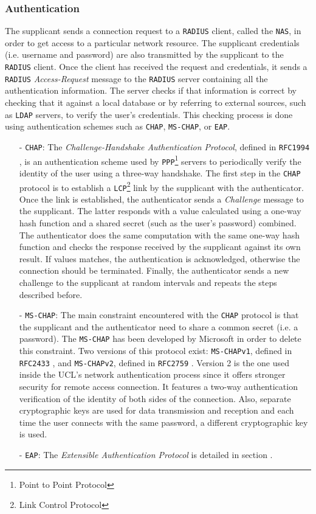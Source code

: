 \subsubsection{Authentication}
The supplicant sends a connection request to a \texttt{RADIUS} client, called the \texttt{NAS}, in order to get access to a particular network resource. The supplicant credentials (i.e. username and password) are also transmitted by the supplicant to the \texttt{RADIUS} client. Once the client has received the request and credentials, it sends a \texttt{RADIUS} \textit{Access-Request} message to the \texttt{RADIUS} server containing all the authentication information. The server checks if that information is correct by checking that it against a local database or by referring to external sources, such as \texttt{LDAP} servers, to verify the user's credentials. This checking process is done using authentication schemes such as \texttt{CHAP}, \texttt{MS-CHAP}, or \texttt{EAP}.
	\begin{itemize}
		\item [-] \texttt{CHAP}: The \textit{Challenge-Handshake Authentication Protocol}, defined in \texttt{RFC1994} \cite{rfc1994}, is an authentication scheme used by \texttt{PPP}\footnote{Point to Point Protocol} servers to periodically verify the identity of the user using a three-way handshake. The first step in the \texttt{CHAP} protocol is to establish a \texttt{LCP}\footnote{Link Control Protocol} link by the supplicant with the authenticator. Once the link is established, the authenticator sends a \textit{Challenge} message to the supplicant. The latter responds with a value calculated using a one-way hash function and a shared secret (such as the user's password) combined. The authenticator does the same computation with the same one-way hash function and checks the response received by the supplicant against its own result. If values matches, the authentication is acknowledged, otherwise the connection should be terminated. Finally, the authenticator sends a new challenge to the supplicant at random intervals and repeats the steps described before.

		\item [-] \texttt{MS-CHAP}: The main constraint encountered with the \texttt{CHAP} protocol is that the supplicant and the authenticator need to share a common secret (i.e. a password). The \texttt{MS-CHAP} has been developed by Microsoft in order to delete this constraint. Two versions of this protocol exist: \texttt{MS-CHAPv1}, defined in \texttt{RFC2433} \cite{rfc2433}, and \texttt{MS-CHAPv2}, defined in \texttt{RFC2759} \cite{rfc2759}. Version 2 is the one used inside the UCL's network authentication process since it offers stronger security for remote access connection. It features a two-way authentication verification of the identity of both sides of the connection. Also, separate cryptographic keys are used for data transmission and reception and each time the user connects with the same password, a different cryptographic key is used.

		\item [-] \texttt{EAP}: The \textit{Extensible Authentication Protocol} is detailed in section .
	\end{itemize}

